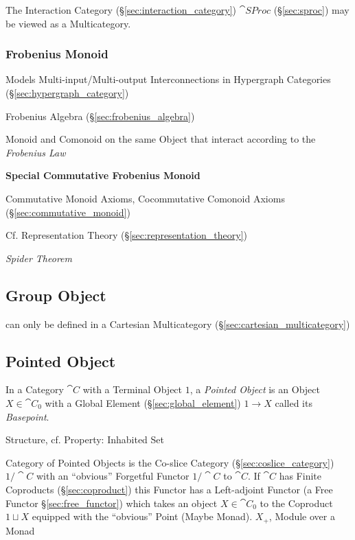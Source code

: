 The Interaction Category (\S\ref{sec:interaction_category})
$\cat{SProc}$ (\S\ref{sec:sproc}) may be viewed as a Multicategory.



\subsubsection{Frobenius Monoid}\label{sec:frobenius_monoid}

Models Multi-input/Multi-output Interconnections in Hypergraph
Categories (\S\ref{sec:hypergraph_category})

\fist Frobenius Algebra (\S\ref{sec:frobenius_algebra})

Monoid and Comonoid on the same Object that interact according to the
\emph{Frobenius Law}


\textbf{Special Commutative Frobenius Monoid}

Commutative Monoid Axioms, Cocommutative Comonoid Axioms
(\S\ref{sec:commutative_monoid})

\fist Cf. Representation Theory (\S\ref{sec:representation_theory})

\emph{Spider Theorem}



\subsection{Group Object}\label{sec:group_object}

can only be defined in a Cartesian Multicategory
(\S\ref{sec:cartesian_multicategory})



\subsection{Pointed Object}\label{sec:pointed_object}

In a Category $\cat{C}$ with a Terminal Object $1$, a \emph{Pointed Object} is
an Object $X \in \cat{C}_0$ with a Global Element (\S\ref{sec:global_element})
$1 \rightarrow X$ called its \emph{Basepoint}.

Structure, cf. Property: Inhabited Set %

Category of Pointed Objects is the Co-slice Category
(\S\ref{sec:coslice_category}) $1/\cat{C}$ with an ``obvious'' Forgetful
Functor $1 / \cat{C}$ to $\cat{C}$. If $\cat{C}$ has Finite Coproducts
(\S\ref{sec:coproduct}) this Functor has a Left-adjoint Functor (a Free Functor
\S\ref{sec:free_functor}) which takes an object $X \in \cat{C}_0$ to the
Coproduct $1 \sqcup X$ equipped with the ``obvious'' Point (Maybe Monad).
$X_+$, Module over a Monad %



